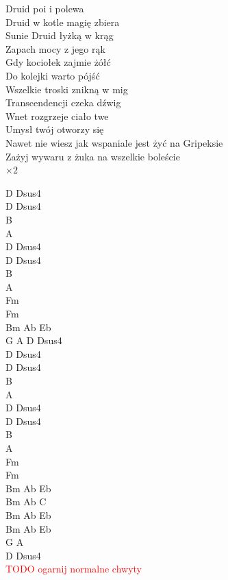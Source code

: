 \documentclass[a5paper, 10pt]{book}
\begin{document}
\begin{minipage}[t]{0.85\textwidth}
Druid poi i polewa                   \\
Druid w kotle magię zbiera\\
Sunie Druid łyżką w krąg    \\
Zapach mocy z jego rąk     \\
Gdy kociołek zajmie żółć       \\
Do kolejki warto pójść\\
Wszelkie troski znikną w mig     \\
Transcendencji czeka dźwig    \\
\hspace*{3mm}Wnet rozgrzeje ciało twe          \\
\hspace*{3mm}Umysł twój otworzy się\\

Nawet nie wiesz jak wspaniale jest żyć na Gripeksie\\
Zażyj wywaru z żuka na wszelkie boleście               \\
\hspace*{2cm}$\times 2$\\
\end{minipage}
\begin{minipage}[t]{0.15\textwidth}
  D Dsus4\\
  D Dsus4\\
B\\
A\\
D Dsus4\\
D Dsus4\\
B\\
A\\

Fm\\
Fm\\

Bm Ab Eb\\
G A D Dsus4\\
D Dsus4\\
  D Dsus4\\
B\\
A\\
D Dsus4\\
D Dsus4\\
B\\
A\\

Fm\\
Fm\\

Bm Ab Eb\\
Bm Ab C\\
Bm Ab Eb\\
Bm Ab Eb\\
G A\\
D Dsus4\\

\textcolor{red}{TODO ogarnij normalne chwyty}\\
\end{minipage}
\end{document}
